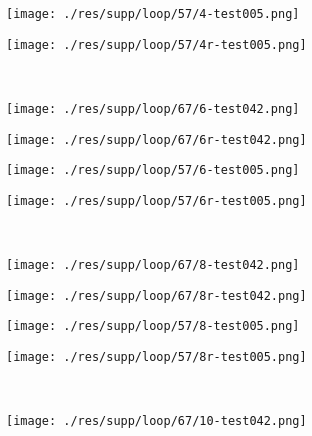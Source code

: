 \documentclass{article} %
\begin{document}
\begin{figure}[htp!]
\begin{subfigure}[t]{0.22\textwidth}
		\centering
		\texttt{[image: ./res/supp/loop/57/4-test005.png]}
	\end{subfigure}
	\begin{subfigure}[t]{0.22\textwidth}
		\centering
		\texttt{[image: ./res/supp/loop/57/4r-test005.png]}
	\end{subfigure}\\
	\begin{subfigure}[t]{0.22\textwidth}
		\centering
		\texttt{[image: ./res/supp/loop/67/6-test042.png]}
	\end{subfigure}
	\begin{subfigure}[t]{0.22\textwidth}
		\centering
		\texttt{[image: ./res/supp/loop/67/6r-test042.png]}
	\end{subfigure}
	\hspace{2pt}
	\begin{subfigure}[t]{0.22\textwidth}
		\centering
		\texttt{[image: ./res/supp/loop/57/6-test005.png]}
	\end{subfigure}
	\begin{subfigure}[t]{0.22\textwidth}
		\centering
		\texttt{[image: ./res/supp/loop/57/6r-test005.png]}
	\end{subfigure}\\
	\begin{subfigure}[t]{0.22\textwidth}
		\centering
		\texttt{[image: ./res/supp/loop/67/8-test042.png]}
	\end{subfigure}
	\begin{subfigure}[t]{0.22\textwidth}
		\centering
		\texttt{[image: ./res/supp/loop/67/8r-test042.png]}
	\end{subfigure}
	\hspace{2pt}
	\begin{subfigure}[t]{0.22\textwidth}
		\centering
		\texttt{[image: ./res/supp/loop/57/8-test005.png]}
	\end{subfigure}
	\begin{subfigure}[t]{0.22\textwidth}
		\centering
		\texttt{[image: ./res/supp/loop/57/8r-test005.png]}
	\end{subfigure}\\
	\begin{subfigure}[t]{0.22\textwidth}
		\centering
		\texttt{[image: ./res/supp/loop/67/10-test042.png]}
	\end{subfigure}
	\begin{subfigure}[t]{0.22\textwidth}

\end{subfigure}
\end{figure}
\end{document}
